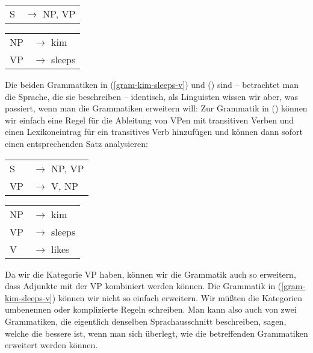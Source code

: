 \ea
\begin{tabular}[t]{@{}l@{ }l}       
{S}  & {$\to$ NP, VP}\\
\end{tabular}\hspace{2cm}%
\begin{tabular}[t]{@{}l@{ }l}
{NP} & {$\to$ kim}\\
{VP} & {$\to$ sleeps}\\
\end{tabular}
\z
Die beiden Grammatiken in (\ref{gram-kim-sleeps-v}) und () sind -- betrachtet man die Sprache, die sie beschreiben -- identisch,
als Linguisten wissen wir aber, was passiert, wenn man die Grammatiken erweitern will: Zur Grammatik
in () können wir einfach eine Regel für die Ableitung von VPen mit transitiven Verben und
einen Lexikoneintrag für ein transitives Verb hinzufügen und können dann sofort einen entsprechenden
Satz analysieren:
\ea
\begin{tabular}[t]{@{}l@{ }l}       
{S}  & {$\to$ NP, VP}\\
VP   & $\to$ V, NP\\
\end{tabular}\hspace{2cm}%
\begin{tabular}[t]{@{}l@{ }l}
{NP} & {$\to$ kim}\\
{VP} & {$\to$ sleeps}\\
V    & $\to$ likes\\
\end{tabular}
\z
Da wir die Kategorie VP haben, können wir die Grammatik auch so erweitern, dass Adjunkte
mit der VP kombiniert werden können. Die Grammatik in (\ref{gram-kim-sleeps-v}) können wir 
nicht so einfach erweitern. Wir müßten die Kategorien umbenennen oder komplizierte Regeln
schreiben. Man kann also auch von zwei Grammatiken, die eigentlich denselben Sprachausschnitt
beschreiben, sagen, welche die bessere ist, wenn man sich überlegt, wie die betreffenden
Grammatiken erweitert werden können.

